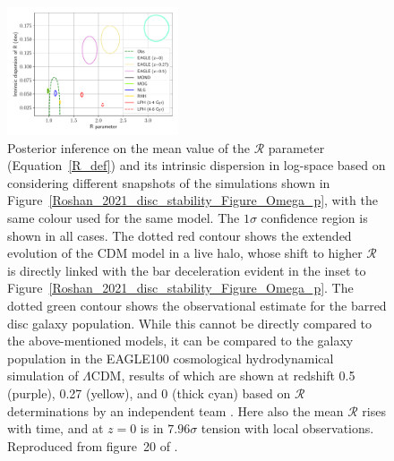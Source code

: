 \documentclass[fleqn,usenatbib,useAMS,onecolumn]{mnras} %
\begin{document}
\begin{figure}
	\centering
	\includegraphics[width=0.45\textwidth]{Roshan_2021_disc_stability_Figure_20}
	\caption{Posterior inference on the mean value of the $\mathcal{R}$ parameter (Equation~\ref{R_def}) and its intrinsic dispersion in log-space based on considering different snapshots of the simulations shown in Figure~\ref{Roshan_2021_disc_stability_Figure_Omega_p}, with the same colour used for the same model. The $1\sigma$ confidence region is shown in all cases. The dotted red contour shows the extended evolution of the CDM model in a live halo, whose shift to higher $\mathcal{R}$ is directly linked with the bar deceleration evident in the inset to Figure~\ref{Roshan_2021_disc_stability_Figure_Omega_p}. The dotted green contour shows the observational estimate for the barred disc galaxy population. While this cannot be directly compared to the above-mentioned models, it can be compared to the galaxy population in the EAGLE100 cosmological hydrodynamical simulation of $\Lambda$CDM, results of which are shown at redshift 0.5 (purple), 0.27 (yellow), and 0 (thick cyan) based on $\mathcal{R}$ determinations by an independent team \citep{Algorry_2017}. Here also the mean $\mathcal{R}$ rises with time, and at $z = 0$ is in $7.96\sigma$ tension with local observations. Reproduced from figure~20 of \citet{Roshan_2021_disc_stability}.}
	\label{Roshan_2021_disc_stability_Figure_R}
\end{figure}
\end{document}

